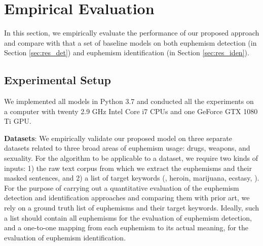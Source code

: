\section{Empirical Evaluation}
\label{sec:res}
In this section, we empirically evaluate the performance of our proposed approach and compare with that a set of baseline models on both euphemism detection (in Section \ref{sec:res_det}) and euphemism identification (in Section \ref{sec:res_iden}). 

\subsection{Experimental Setup}
We implemented all  models in Python 3.7 and conducted all the experiments on a computer with twenty 2.9 GHz Intel Core i7 CPUs and one GeForce GTX 1080 Ti GPU. 

\noindent \textbf{Datasets}: 
We empirically validate our proposed model on  three separate datasets related to three broad areas of euphemism usage: drugs, weapons, and sexuality. 
For the algorithm to be applicable to a dataset, we require two kinds of inputs: 1) the raw text corpus from which we extract the euphemisms and their masked sentences, and 2) a list of target keywords (\eg, heroin, marijuana, ecstasy, \etc). 
For the purpose of carrying out a quantitative evaluation of the euphemism detection and identification approaches and comparing them with prior art, we rely on a ground truth list of  euphemisms and their target keywords. Ideally, such a list  should contain all  euphemisms for the evaluation of euphemism detection, and a one-to-one mapping from each euphemism to its actual meaning, for the evaluation of euphemism identification. 

